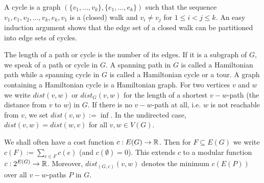 A cycle is a graph $(\{v_1, \dots , v_k\}, \{e_1, \dots, e_k\})$ such that the sequence $v_1, e_1, v_2, 
\dots , v_k,e_k,v_1$ is a (closed) walk and $v_i \ne v_j$ for $1 \le i < j\le k$.
An easy induction argument shows that the edge set of a closed walk can be
partitioned into edge sets of cycles.

The length of a path or cycle is the number of its edges. If it is a subgraph
of $G$, we speak of a path or cycle in $G$. A spanning path in $G$ is called a
Hamiltonian path while a spanning cycle in $G$ is called a Hamiltonian cycle
or a tour. A graph containing a Hamiltonian cycle is a Hamiltonian graph.
For two vertices $v$ and $w$ we write $dist(v, w)$ or $dist_G (v, w)$ for the length of
a shortest $v-w$-path (the distance from $v$ to $w$) in $G$. If there is no $v-w$-path at all,
i.e. $w$ is not reachable from $v$, we set $dist(v, w) := \inf$. In the undirected case,
$dist(v, w) = dist(w, v)$ for all $v, w \in V(G)$.

We shall often have a cost function $c : E(G) \to \mathbb{R}$. Then for $F \subseteq E(G)$ we
write $c(F) := \sum_{e\in F} c(e)$ (and $c(\emptyset) = 0$). This extends $c$ to a modular function
$c : 2^{E(G)}\to \mathbb{R}$. Moreover, $dist_{(G,c)}(v, w)$ denotes the minimum $c(E(P))$ over all
$v-w$-paths $P$ in $G$.
